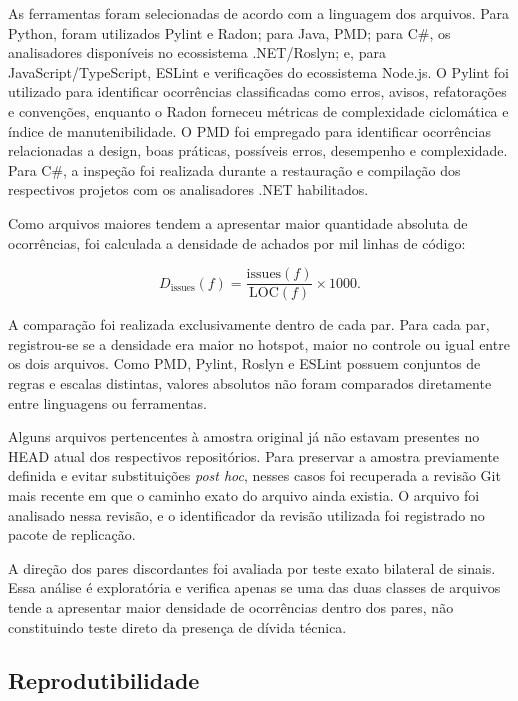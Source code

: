 \documentclass[12pt]{article}
\begin{document}
As ferramentas foram selecionadas de acordo com a linguagem dos arquivos. Para Python, foram utilizados Pylint e Radon; para Java, PMD; para C\#, os analisadores disponíveis no ecossistema .NET/Roslyn; e, para JavaScript/TypeScript, ESLint e verificações do ecossistema Node.js. O Pylint foi utilizado para identificar ocorrências classificadas como erros, avisos, refatorações e convenções, enquanto o Radon forneceu métricas de complexidade ciclomática e índice de manutenibilidade. O PMD foi empregado para identificar ocorrências relacionadas a design, boas práticas, possíveis erros, desempenho e complexidade. Para C\#, a inspeção foi realizada durante a restauração e compilação dos respectivos projetos com os analisadores .NET habilitados.

Como arquivos maiores tendem a apresentar maior quantidade absoluta de ocorrências, foi calculada a densidade de achados por mil linhas de código:

\begin{equation}
D_{\mathrm{issues}}(f)=\frac{\mathrm{issues}(f)}{\mathrm{LOC}(f)}\times 1000.
\end{equation}

A comparação foi realizada exclusivamente dentro de cada par. Para cada par, registrou-se se a densidade era maior no hotspot, maior no controle ou igual entre os dois arquivos. Como PMD, Pylint, Roslyn e ESLint possuem conjuntos de regras e escalas distintas, valores absolutos não foram comparados diretamente entre linguagens ou ferramentas.

Alguns arquivos pertencentes à amostra original já não estavam presentes no HEAD atual dos respectivos repositórios. Para preservar a amostra previamente definida e evitar substituições \emph{post hoc}, nesses casos foi recuperada a revisão Git mais recente em que o caminho exato do arquivo ainda existia. O arquivo foi analisado nessa revisão, e o identificador da revisão utilizada foi registrado no pacote de replicação.

A direção dos pares discordantes foi avaliada por teste exato bilateral de sinais. Essa análise é exploratória e verifica apenas se uma das duas classes de arquivos tende a apresentar maior densidade de ocorrências dentro dos pares, não constituindo teste direto da presença de dívida técnica.

\subsection{Reprodutibilidade}
\end{document}
